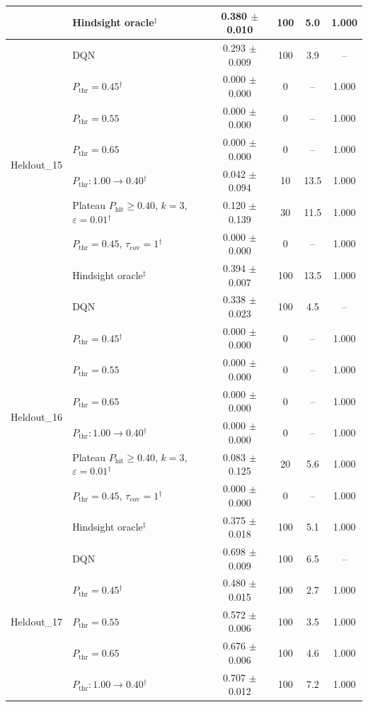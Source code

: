 \begin{table}[htbp]
\begin{tabular}{llcccc}
 & Hindsight oracle$^{\ddagger}$ & 0.380 $\pm$ 0.010 & 100 & 5.0 & 1.000 \\
\midrule
\multirow{8}{*}{Heldout\_15} & DQN & 0.293 $\pm$ 0.009 & 100 & 3.9 & -- \\
 & $P_{\mathrm{thr}}=0.45$$^{\dagger}$ & 0.000 $\pm$ 0.000 & 0 & -- & 1.000 \\
 & $P_{\mathrm{thr}}=0.55$ & 0.000 $\pm$ 0.000 & 0 & -- & 1.000 \\
 & $P_{\mathrm{thr}}=0.65$ & 0.000 $\pm$ 0.000 & 0 & -- & 1.000 \\
 & $P_{\mathrm{thr}}: 1.00 \to 0.40$$^{\dagger}$ & 0.042 $\pm$ 0.094 & 10 & 13.5 & 1.000 \\
 & Plateau $P_{\mathrm{hit}}\geq0.40$, $k=3$, $\varepsilon=0.01$$^{\dagger}$ & 0.120 $\pm$ 0.139 & 30 & 11.5 & 1.000 \\
 & $P_{\mathrm{thr}}=0.45$, $\tau_{\mathrm{cov}}=1$$^{\dagger}$ & 0.000 $\pm$ 0.000 & 0 & -- & 1.000 \\
 & Hindsight oracle$^{\ddagger}$ & 0.394 $\pm$ 0.007 & 100 & 13.5 & 1.000 \\
\midrule
\multirow{8}{*}{Heldout\_16} & DQN & 0.338 $\pm$ 0.023 & 100 & 4.5 & -- \\
 & $P_{\mathrm{thr}}=0.45$$^{\dagger}$ & 0.000 $\pm$ 0.000 & 0 & -- & 1.000 \\
 & $P_{\mathrm{thr}}=0.55$ & 0.000 $\pm$ 0.000 & 0 & -- & 1.000 \\
 & $P_{\mathrm{thr}}=0.65$ & 0.000 $\pm$ 0.000 & 0 & -- & 1.000 \\
 & $P_{\mathrm{thr}}: 1.00 \to 0.40$$^{\dagger}$ & 0.000 $\pm$ 0.000 & 0 & -- & 1.000 \\
 & Plateau $P_{\mathrm{hit}}\geq0.40$, $k=3$, $\varepsilon=0.01$$^{\dagger}$ & 0.083 $\pm$ 0.125 & 20 & 5.6 & 1.000 \\
 & $P_{\mathrm{thr}}=0.45$, $\tau_{\mathrm{cov}}=1$$^{\dagger}$ & 0.000 $\pm$ 0.000 & 0 & -- & 1.000 \\
 & Hindsight oracle$^{\ddagger}$ & 0.375 $\pm$ 0.018 & 100 & 5.1 & 1.000 \\
\midrule
\multirow{8}{*}{Heldout\_17} & DQN & 0.698 $\pm$ 0.009 & 100 & 6.5 & -- \\
 & $P_{\mathrm{thr}}=0.45$$^{\dagger}$ & 0.480 $\pm$ 0.015 & 100 & 2.7 & 1.000 \\
 & $P_{\mathrm{thr}}=0.55$ & 0.572 $\pm$ 0.006 & 100 & 3.5 & 1.000 \\
 & $P_{\mathrm{thr}}=0.65$ & 0.676 $\pm$ 0.006 & 100 & 4.6 & 1.000 \\
 & $P_{\mathrm{thr}}: 1.00 \to 0.40$$^{\dagger}$ & 0.707 $\pm$ 0.012 & 100 & 7.2 & 1.000 \\

\end{tabular}
\end{table}
